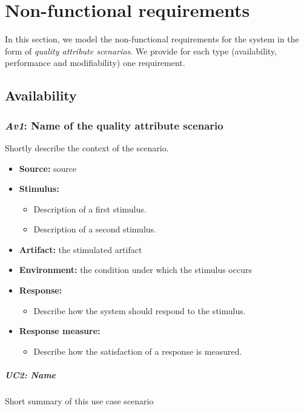\documentclass[english]{sareport}
\begin{document}
\chapter{Non-functional requirements}\label{sec:non-functional}
In this section, we model the non-functional requirements for the system in the
form of \emph{quality attribute scenarios}. We provide for each type
(availability, performance and modifiability) one requirement.

\section{Availability}
\subsection{\emph{Av1}: Name of the quality attribute scenario}
Shortly describe the context of the scenario.

\begin{itemize}
    \item \textbf{Source:} source
    \item \textbf{Stimulus:}
        \begin{itemize}
            \item Description of a first stimulus.
            \item Description of a second stimulus.
        \end{itemize}

    \item \textbf{Artifact:} the stimulated artifact
    \item \textbf{Environment:} the condition under which the stimulus occurs
    \item \textbf{Response:}
        \begin{itemize}
            \item Describe how the system should respond to the stimulus.
        \end{itemize}

    \item \textbf{Response measure:}
        \begin{itemize}
            \item Describe how the satisfaction of a response is measured.
        \end{itemize}
\end{itemize}

\paragraph{UC2: Name}
Short summary of this use case scenario
\end{document}
